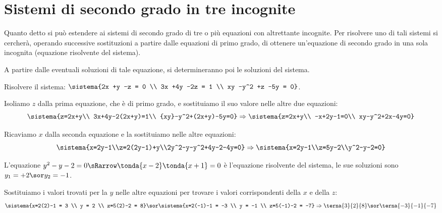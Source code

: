 
\section{Sistemi di secondo grado in tre incognite}
\label{sec:sist2gr_sistemitrei}

Quanto detto si può estendere ai sistemi di secondo grado di tre o più 
equazioni 
con altrettante incognite. Per risolvere uno di tali sistemi si cercherà, 
operando successive sostituzioni a partire dalle equazioni di primo 
grado, di ottenere un'equazione di secondo grado in una sola incognita 
(equazione risolvente del sistema).

A partire dalle eventuali soluzioni di tale equazione, si determineranno 
poi le soluzioni del sistema.

\begin{esempio}{}{}
Risolvere il sistema: \quad 
\(\sistema{2x +y -z = 0 \\ 3x +4y -2z = 1 \\ xy -y^2 +z -5y = 0}\).

\medskip
Isoliamo \(z\) dalla prima equazione, che è di primo grado, e 
sostituiamo il suo valore nelle altre due equazioni: 
{\small
\[\sistema{z=2x+y\\
3x+4y-2(2x+y)=1\\
{xy}-y^2+(2x+y)-5y=0} \Rightarrow
\sistema{z=2x+y\\
-x+2y-1=0\\
xy-y^2+2x-4y=0}\]
} %

Ricaviamo \(x\) dalla seconda equazione e la sostituiamo nelle altre 
equazioni: 
\[ \sistema{x=2y-1\\z=2(2y-1)+y\\2y^2-y-y^2+4y-2-4y=0} 
\Rightarrow\sistema{x=2y-1\\z=5y-2\\y^2-y-2=0}\]

L'equazione \(y^2-y-2 = 0 \sRarrow \tonda{x-2} \tonda{x+1} = 0\) è 
l'equazione risolvente del sistema, le sue soluzioni sono 
\(y_1 = +2 \sor y_2 = -1\).

Sostituiamo i valori trovati per la \(y\) nelle altre equazioni per 
trovare i valori corrispondenti della \(x\) e della \(z\): 
\[ \sistema{x=2(2)-1 = 3 \\ y = 2 \\ z=5(2)-2 = 8} \sor 
\sistema{x=2(-1)-1 = -3 \\ y = -1 \\ z=5(-1)-2 = -7}\Rightarrow 
\terna{3}{2}{8} \sor \terna{-3}{-1}{-7}\]
\end{esempio}

